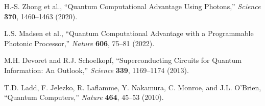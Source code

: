 \documentclass[11pt]{article}
\theoremstyle{plain}
\theoremstyle{definition}
\theoremstyle{remark}
\begin{document}
\begin{thebibliography}{99}
 H.-S. Zhong et al., ``Quantum Computational Advantage Using Photons,'' \emph{Science} \textbf{370}, 1460--1463 (2020).

 L.S. Madsen et al., ``Quantum Computational Advantage with a Programmable Photonic Processor,'' \emph{Nature} \textbf{606}, 75--81 (2022).

 M.H. Devoret and R.J. Schoelkopf, ``Superconducting Circuits for Quantum Information: An Outlook,'' \emph{Science} \textbf{339}, 1169--1174 (2013).

 T.D. Ladd, F. Jelezko, R. Laflamme, Y. Nakamura, C. Monroe, and J.L. O'Brien, ``Quantum Computers,'' \emph{Nature} \textbf{464}, 45--53 (2010).

\end{thebibliography}
\end{document}
